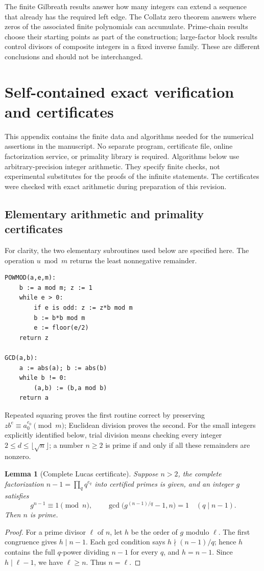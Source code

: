 \documentclass[11pt,a4paper]{article}
\newtheorem{lemma}[theorem]{Lemma}
\theoremstyle{definition}
\theoremstyle{remark}
\numberwithin{equation}{section}
\begin{document}
The finite Gilbreath results answer how many integers can extend a sequence
that already has the required left edge. The Collatz zero theorem answers where
zeros of the associated finite polynomials can accumulate. Prime-chain results
choose their starting points as part of the construction; large-factor block
results control divisors of composite integers in a fixed inverse family.
These are different conclusions and should not be interchanged.


\section{Self-contained exact verification and certificates}
\label{A:app:certificates}

This appendix contains the finite data and algorithms needed for the
numerical assertions in the manuscript. No separate program, certificate
file, online factorization service, or primality library is required.
Algorithms below use arbitrary-precision integer arithmetic. They specify
finite checks, not experimental substitutes for the proofs of the infinite
statements. The certificates were checked with exact arithmetic during
preparation of this revision.

\subsection{Elementary arithmetic and primality certificates}

For clarity, the two elementary subroutines used below are specified here.
The operation $u\bmod m$ returns the least nonnegative remainder.
\begin{verbatim}
POWMOD(a,e,m):
    b := a mod m; z := 1
    while e > 0:
        if e is odd: z := z*b mod m
        b := b*b mod m
        e := floor(e/2)
    return z

GCD(a,b):
    a := abs(a); b := abs(b)
    while b != 0:
        (a,b) := (b,a mod b)
    return a
\end{verbatim}
Repeated squaring proves the first routine correct by preserving
$z b^e\equiv a_0^{e_0}\pmod m$; Euclidean division proves the second.
For the small integers explicitly identified below, trial division means
checking every integer $2\le d\le\lfloor\sqrt n\rfloor$; a number $n\ge2$
is prime if and only if all these remainders are nonzero.

\begin{lemma}[Complete Lucas certificate]
\label{A:lem:lucas-certificate}
Suppose $n>2$, the complete factorization $n-1=\prod_q q^{e_q}$ into
certified primes is given, and an integer $g$ satisfies
\[
 g^{n-1}\equiv1\pmod n,\qquad
 \gcd\bigl(g^{(n-1)/q}-1,n\bigr)=1\quad(q\mid n-1).
\]
Then $n$ is prime.
\end{lemma}
\begin{proof}
For a prime divisor $\ell$ of $n$, let $h$ be the order of $g$ modulo
$\ell$. The first congruence gives $h\mid n-1$. Each gcd condition says
$h\nmid(n-1)/q$; hence $h$ contains the full $q$-power dividing $n-1$
for every $q$, and $h=n-1$. Since $h\mid\ell-1$, we have
$\ell\ge n$. Thus $n=\ell$.
\end{proof}
\end{document}
